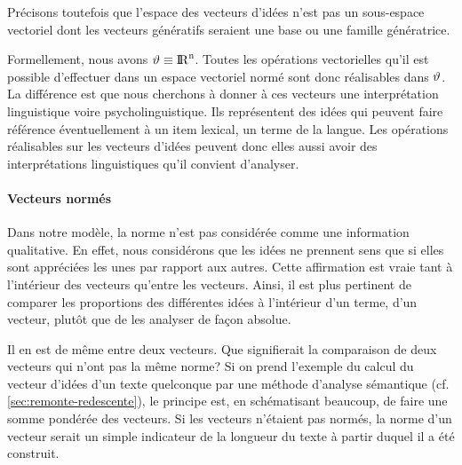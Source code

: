 {%
Précisons toutefois que l'espace des vecteurs d'idées n'est pas un
  sous-espace vectoriel dont les vecteurs génératifs seraient une base
  ou une famille génératrice.



Formellement, nous avons $\vartheta \equiv \rm{I \! R}^n$. Toutes les opérations
vectorielles qu'il est possible d'effectuer dans un espace vectoriel
normé  sont
donc réalisables dans $\vartheta$.  La différence est que nous cherchons
à donner à ces vecteurs une interprétation linguistique voire
psycholinguistique. Ils représentent des idées qui peuvent faire
référence éventuellement à un item lexical, un terme de la langue.
Les opérations réalisables sur les  vecteurs
d'idées peuvent donc elles aussi avoir des interprétations
linguistiques qu'il convient d'analyser.  

\paragraph{Vecteurs normés}

Dans notre modèle, la norme n'est pas considérée comme une information
qualitative. En effet, nous considérons que les idées ne prennent sens
que si elles sont appréciées les unes par rapport aux autres. Cette
affirmation est vraie tant à l'intérieur des vecteurs qu'entre les
vecteurs. Ainsi, il est plus pertinent de comparer les proportions des
différentes idées à l'intérieur d'un terme, d'un vecteur, plutôt que
de les analyser de façon absolue.

Il en est de même entre deux vecteurs. Que signifierait la comparaison
de deux vecteurs qui n'ont pas la même norme? Si on prend l'exemple du
calcul du vecteur d'idées d'un texte
quelconque par une méthode d'analyse sémantique (cf.
\ref{sec:remonte-redescente}), le principe est, en schématisant
beaucoup, de faire une somme pondérée des vecteurs. Si les vecteurs
n'étaient pas normés, la norme d'un vecteur serait un simple
indicateur de la longueur du texte à partir duquel il a été construit.

}
